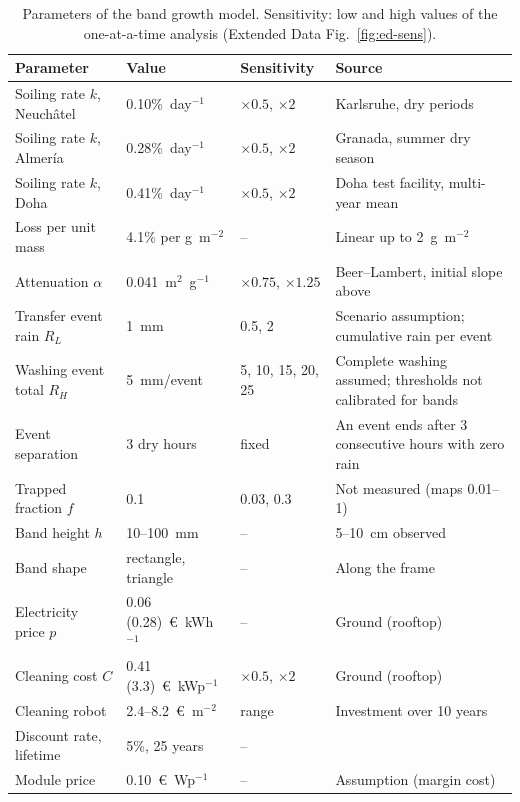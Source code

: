 \begin{table}[!t]
\caption{Parameters of the band growth model. Sensitivity: low and high values of the one-at-a-time analysis (Extended Data Fig.~\ref{fig:ed-sens}).\label{tab:bandparams}}
\begin{tabularx}{\textwidth}{p{3.6cm}p{3.0cm}p{2.3cm}X}
\toprule
\textbf{Parameter} & \textbf{Value} & \textbf{Sensitivity} & \textbf{Source} \\
\midrule
\rowcolor{tabgrey} Soiling rate $k$, Neuch\^atel & 0.10\%~day$^{-1}$ & $\times 0.5$, $\times 2$ & Karlsruhe, dry periods \cite{WorldEnergyMeteorology} \\
Soiling rate $k$, Almer\'ia & 0.28\%~day$^{-1}$ & $\times 0.5$, $\times 2$ & Granada, summer dry season \cite{micheliEconomicsSeasonalPhotovoltaic2021} \\
\rowcolor{tabgrey} Soiling rate $k$, Doha & 0.41\%~day$^{-1}$ & $\times 0.5$, $\times 2$ & Doha test facility, multi-year mean \cite{ahziInvestigationPVSoiling} \\
Loss per unit mass & 4.1\% per g~m$^{-2}$ & -- & Linear up to 2~g~m$^{-2}$ \cite{boyleNaturalSoilingPhotovoltaic2015} \\
\rowcolor{tabgrey} Attenuation $\alpha$ & 0.041~m$^{2}$~g$^{-1}$ & $\times 0.75$, $\times 1.25$ & Beer--Lambert, initial slope above \\
Transfer event rain $R_L$ & 1~mm & 0.5, 2 & Scenario assumption; cumulative rain per event \\
\rowcolor{tabgrey} Washing event total $R_H$ & 5~mm/event & 5, 10, 15, 20, 25 & Complete washing assumed; thresholds not calibrated for bands \\
Event separation & 3 dry hours & fixed & An event ends after 3 consecutive hours with zero rain \\
\rowcolor{tabgrey} Trapped fraction $f$ & 0.1 & 0.03, 0.3 & Not measured (maps 0.01--1) \\
Band height $h$ & 10--100~mm & -- & 5--10~cm observed \cite{yanYao2018} \\
\rowcolor{tabgrey} Band shape & rectangle, triangle & -- & Along the frame \cite{cuiCharacterizationSoilingBands2021a} \\
Electricity price $p$ & 0.06 (0.28)~\euro~kWh$^{-1}$ & -- & Ground (rooftop) \cite{ilseTechnoEconomicAssessmentSoiling2019a} \\
\rowcolor{tabgrey} Cleaning cost $C$ & 0.41 (3.3)~\euro~kWp$^{-1}$ & $\times 0.5$, $\times 2$ & Ground (rooftop) \cite{ilseTechnoEconomicAssessmentSoiling2019a} \\
Cleaning robot & 2.4--8.2~\euro~m$^{-2}$ & range & Investment over 10 years \cite{ilseTechnoEconomicAssessmentSoiling2019a} \\
\rowcolor{tabgrey} Discount rate, lifetime & 5\%, 25 years & -- & \cite{ilseTechnoEconomicAssessmentSoiling2019a} \\
Module price & 0.10~\euro~Wp$^{-1}$ & -- & Assumption (margin cost) \\
\bottomrule
\end{tabularx}
\end{table}
